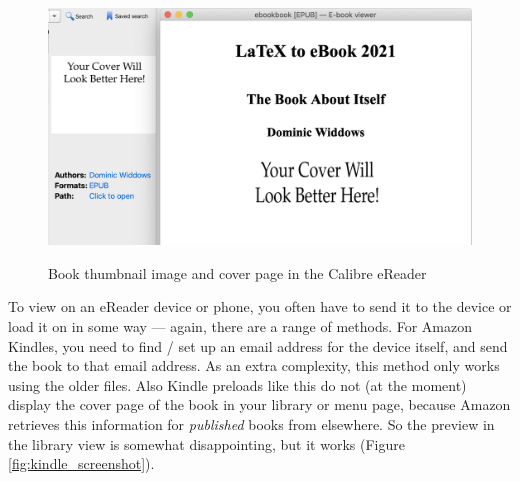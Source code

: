 \begin{figure}
  \begin{center}
  \vspace{0.2cm}
\includegraphics[width=\linewidth]{images/calibre_screenshot.png}
\caption{Book thumbnail image and cover page in the Calibre eReader}
\vspace{0.4cm}
\label{fig:calibre_screenshot}
\end{center}
\end{figure}

To view on an eReader device or phone, you often have to send it to
the device or load it on in some way --- again, there are a range of
methods. For Amazon Kindles, you need to find / set up an email address for the
device itself, and send the book to that email address. As an extra
complexity, this method only works using the older 
files.  Also Kindle preloads like this do not (at the moment)
display the cover page of the book in your library or menu page,
because Amazon retrieves this information for {\em published} books
from elsewhere. So the preview in the library view is somewhat
disappointing, but it works (Figure \ref{fig:kindle_screenshot}).

